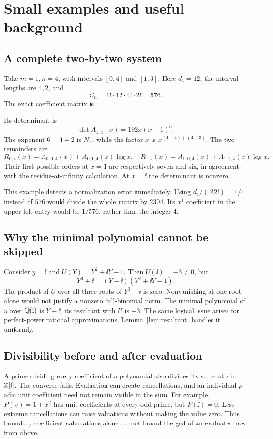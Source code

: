 \section{Small examples and useful background}
\label{app:examples}

\subsection{A complete two-by-two system}

Take \(m=1,n=4\), with intervals \([0,4]\) and \([1,3]\).
Here \(d_4=12\), the interval lengths are \(4,2\), and
\[
C_n=1!\cdot12\cdot4!\cdot2!=576.
\]
The exact coefficient matrix is
\begingroup
\small
\setlength{\arraycolsep}{9pt}

\endgroup
Its determinant is
\[
\det A_{1,4}(x)=192x(x-1)^6.
\]
The exponent \(6=4+2\) is \(N_n\), while the factor \(x\) is
\(x^{(4-4)+(4-3)}\). The two remainders are
\[
R_{0,4}(x)=A_{0,0,4}(x)+A_{0,1,4}(x)\log x,\quad
R_{1,4}(x)=A_{1,0,4}(x)+A_{1,1,4}(x)\log x.
\]
Their first possible orders at \(x=1\) are respectively seven and
six, in agreement with the residue-at-infinity calculation.
At \(x=\ii\) the determinant is nonzero.

This example detects a normalization error immediately.
Using \(d_4/(4!2!)=1/4\) instead of \(576\) would divide the whole
matrix by \(2304\). Its \(x^4\) coefficient in the upper-left entry
would be \(1/576\), rather than the integer \(4\).

\subsection{Why the minimal polynomial cannot be skipped}

Consider \(y=\ii\) and \(U(Y)=Y^2+\ii Y-1\).
Then \(U(\ii)=-3\ne0\), but
\[
Y^3+\ii=(Y-\ii)(Y^2+\ii Y-1).
\]
The product of \(U\) over all three roots of \(Y^3+\ii\) is zero.
Nonvanishing at one root alone would not justify a nonzero
full-binomial norm. The minimal polynomial of \(y\) over
\(\mathbb Q(\mathrm{i})\) is \(Y-\ii\); its resultant with \(U\) is \(-3\).
The same logical issue arises for perfect-power rational
approximations. Lemma~\ref{lem:resultant} handles it uniformly.

\subsection{Divisibility before and after evaluation}

A prime dividing every coefficient of a polynomial also divides its
value at \(\ii\) in \(\mathbb Z[\mathrm{i}]\). The converse fails. Evaluation can
create cancellations, and an individual \(p\)-adic unit coefficient
need not remain visible in the sum.
For example, \(P(x)=1+x^2\) has unit coefficients at every odd prime,
but \(P(\ii)=0\). Less extreme cancellations can raise valuations
without making the value zero.
Thus boundary coefficient calculations alone cannot bound the gcd
of an evaluated row from above.

